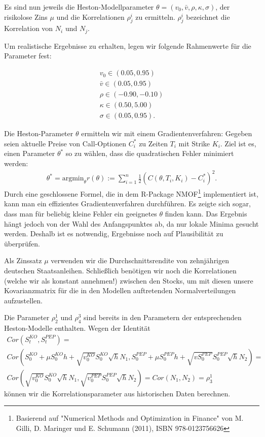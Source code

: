 \documentclass[12pt]{article}
\begin{document}
	Es sind nun jeweils die Heston-Modellparameter $\theta=(v_0,\bar v, \rho, \kappa, \sigma)$, der risikolose Zins $\mu$ und die Korrelationen $\rho^i_j$ zu ermitteln. $\rho^{i}_j$ bezeichnet die Korrelation von $N_i$ und $N_j$.
	
	Um realistische Ergebnisse zu erhalten, legen wir folgende Rahmenwerte für die Parameter fest:
	
	
	
	
	
	
	\begin{gather*}
	v_0 \in (0.05,0.95) \\
	\bar v  \in (0.05,0.95) \\
	\rho \in (-0.90,-0.10) \\
	\kappa \in (0.50,5.00) \\
	\sigma \in (0.05,0.95).
	\end{gather*}
	
	
	
	
	Die Heston-Parameter $\theta$ ermitteln wir mit einem Gradientenverfahren: Gegeben seien aktuelle Preise von Call-Optionen $C_i^*$ zu Zeiten $T_i$ mit Strike $K_i$. Ziel ist es, einen Parameter $\theta^*$ so zu wählen, dass die quadratischen Fehler minimiert werden:
	\begin{gather*}
	\theta^*=\text{argmin}_{\theta} r(\theta):=\sum_{i=1}^n \frac12 (C(\theta,T_i,K_i)-C_i^*)^2.
	\end{gather*}
	Durch eine geschlossene Formel, die in dem R-Package \glqq NMOF\grqq\footnote{Basierend auf "Numerical Methods and Optimization in Finance" von M. Gilli, D. Maringer und E. Schumann (2011), ISBN 978-0123756626} implementiert ist, kann man ein effizientes Gradientenverfahren durchführen. Es zeigte sich sogar, dass man für beliebig kleine Fehler ein geeignetes $\theta$ finden kann. Das Ergebnis hängt jedoch von der Wahl des Anfangspunktes ab, da nur lokale Minima gesucht werden. Deshalb ist es notwendig, Ergebnisse noch auf Plausibilität zu überprüfen.
	
	Als Zinssatz $\mu$ verwenden wir die Durchschnittsrendite von zehnjährigen deutschen Staatsanleihen. 
	Schließlich benötigen wir noch die Korrelationen (welche wir als konstant annehmen!) zwischen den Stocks, um mit diesen unsere Kovarianzmatrix für die in den Modellen auftretenden Normalverteilungen aufzustellen.
	
	Die Parameter $\rho^1_2$ und $\rho^3_4$ sind bereits in den Parametern der entsprechenden Heston-Modelle enthalten. 
	Wegen der Identität
	\begin{gather*}
	Cor(S^{KO}_t,S^{PEP}_t)= \\
	Cor\left(S^{KO}_0+\mu S^{KO}_0h+\sqrt{v^{KO}_0}S^{KO}_0\sqrt{h}N_1,S^{PEP}_0+\mu S^{PEP}_0h+\sqrt{vS^{PEP}_0}S^{PEP}_0\sqrt{h}N_2\right)= \\
	Cor\left(\sqrt{v^{KO}_0}S^{KO}_0\sqrt{h}N_1,\sqrt{v^{PEP}_0}S^{PEP}_0\sqrt{h}N_2\right)=Cor(N_1,N_2)=\rho^1_3
	\end{gather*}
	können wir die Korrelationsparameter aus historischen Daten berechnen.
	
\end{document}
